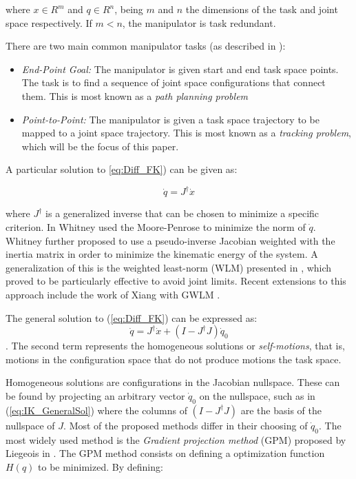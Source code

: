 \documentclass[conference]{IEEEtran}
\newcommand{\J}{\ensuremath{J}}
\newcommand{\Jps}{\ensuremath{J^{\dagger}}}
\newcommand{\dx}{\ensuremath{\dot{x}}}
\newcommand{\dq}{\ensuremath{\dot{q}}}
\newcommand{\q}{\ensuremath{q}}
\begin{document}
where $x \in R^{m}$ and $\q \in R^{n}$, being $m$ and $n$ the dimensions
of the task and joint space respectively. If $m < n$, the manipulator is
task redundant. 

There are two main common manipulator tasks (as described in \cite{seereeram-ns-1995}):

\begin{itemize}
\item{\textit{End-Point Goal:} The manipulator is given start and end task space points. 
The task is to find a sequence of joint space configurations that connect them. 
This is most known as a \textit{path planning problem} } 
\item{\textit{Point-to-Point:} The manipulator is given a task space trajectory to be mapped
to a joint space trajectory. This is most known as a \textit{tracking problem}, which will be 
the focus of this paper.}
\end{itemize}

A particular solution to \ref{eq:Diff_FK}) can be given as:

\begin{equation}
\dq = \Jps \dx
\label{eq:IK_ParticularSol}
\end{equation}

where $\Jps$ is a generalized inverse that can be chosen to minimize a specific criterion. 
In \cite{Whitney-motionRate-1969} Whitney used the Moore-Penrose to minimize the norm of $\dq$. 
Whitney further proposed to use a pseudo-inverse Jacobian weighted with the inertia matrix in 
order to minimize the kinematic energy of the system. A generalization of this is the weighted 
least-norm (WLM) presented in \cite{chan-ns-1995}, which proved to be particularly effective 
to avoid joint limits. Recent extensions to this approach include the work of Xiang with GWLM 
\cite{xiang-ns-2010}.  

The general solution to (\ref{eq:Diff_FK}) can be expressed as:
\begin{equation}
\dq = \Jps \dx + (I - \Jps \J)\dq_{0}
\label{eq:IK_GeneralSol}
\end{equation}
. The second term represents the homogeneous solutions or \textit{self-motions}, that is, motions 
in the configuration space that do not produce motions the task space. 

Homogeneous solutions are configurations in the Jacobian nullspace. These can be found by projecting 
an arbitrary vector $\dq_{0}$ on the nullspace, such as in (\ref{eq:IK_GeneralSol}) where the columns 
of $(I - \Jps \J)$ are the basis of the nullspace of $\J$. Most of the proposed methods differ in 
their choosing of $\dq_{0}$. The most widely used method is the \textit{Gradient projection method} 
(GPM) proposed by Liegeois in \cite{liegeois-ns-1977}. The GPM method consists on defining a 
optimization function $H(\q)$ to be minimized. By defining:
\end{document}
